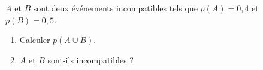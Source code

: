 
$A$ et $B$ sont deux événements incompatibles tels que $p(A)=0,4$ et $p(B)=0,5$.

\begin{enumerate}
\item Calculer $p(A \cup B)$.
\item $\overline{A}$ et $\overline{B}$ sont-ils incompatibles ?
\end{enumerate}